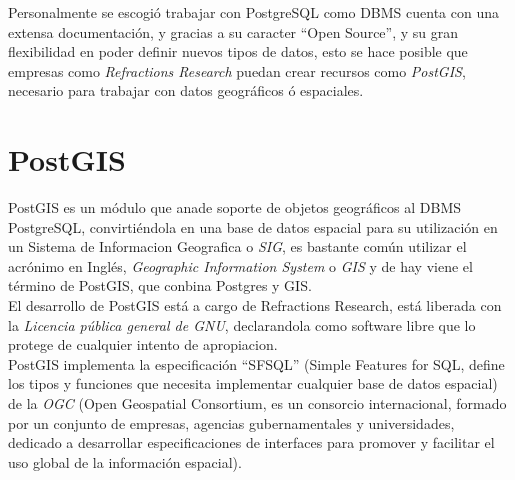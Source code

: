       Personalmente se escogió trabajar con  PostgreSQL como DBMS cuenta con una extensa documentación,  y gracias a su caracter ``Open Source'', y su gran flexibilidad en poder definir nuevos tipos de datos, esto se hace posible que empresas como \emph{Refractions Research} puedan crear recursos como \emph{PostGIS}, necesario para trabajar con datos geográficos \'o espaciales.




    \section{PostGIS} %
    \label{sec:postgis}

      PostGIS es un módulo  que anade soporte de objetos geográficos al DBMS PostgreSQL, convirtiéndola en una base de datos espacial para su utilización en un Sistema de Informacion Geografica o \emph{SIG}, es bastante común utilizar el acrónimo en Inglés, \emph{Geographic Information System} o \emph{GIS} y de hay viene el término de PostGIS, que conbina Postgres y GIS.\\

      El desarrollo de PostGIS está a cargo de Refractions Research, está liberada con la \emph{Licencia pública general de GNU}, declarandola como software libre que lo protege de cualquier intento de apropiacion.\\

      PostGIS implementa la especificaci\'on ``SFSQL'' (Simple Features for SQL, define los tipos y funciones que necesita implementar cualquier base de datos espacial) de la \emph{OGC} (Open Geospatial Consortium, es un consorcio internacional, formado por un conjunto de empresas, agencias gubernamentales y universidades, dedicado a desarrollar especificaciones de interfaces para promover y facilitar el uso global de la información espacial).\\


